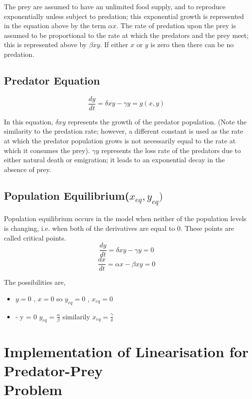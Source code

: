 \documentclass[12pt]{article}
\begin{document}
The prey are assumed to have an unlimited food supply, and to reproduce exponentially unless subject to predation;
this exponential growth is represented in the equation above by the term $ \alpha x . $ The rate of predation upon the prey is
assumed to be proportional to the rate at which the predators and the prey meet; this is represented above by $ \beta x y $. If
either $ x $ or $ y $ is zero then there can be no predation.

\subsection*{Predator Equation}
\begin{equation*}
    \frac { d y } { d t } = \delta x y - \gamma y = g(x,y)
\end{equation*}

In this equation, $ \delta x y $ represents the growth of the predator population. (Note the similarity to the predation rate;
however, a different constant is used as the rate at which the predator population grows is not necessarily equal to the
rate at which it consumes the prey). $ \gamma y $ represents the loss rate of the predators due to either natural death or
emigration; it leads to an exponential decay in the absence of prey.

\subsection*{Population Equilibrium($x_{eq},y_{eq})$}
Population equilibrium occurs in the model when neither of the population levels is changing, i.e. when both of the
derivatives are equal to $ 0 . $ These points are called critical points.
\begin{equation*}
    \frac { d y } { d t } = \delta x y - \gamma y = 0
\end{equation*}
\begin{equation*}
     \frac { d x } { d t } = \alpha x - \beta x y = 0
\end{equation*}

The possibilities are, 
\begin{itemize}
    \item $ y = 0 $ , $ x = 0 $ so $ y_{eq} = 0 $ , $ x_{eq} = 0 $
    \item \alpha - \beta y = 0 \Longrightarrow $y_{eq} = \frac{\alpha}{\beta}$ similarily $x_{eq} = \frac{\gamma}{\delta}$
\end{itemize}

\section*{Implementation of Linearisation for Predator-Prey \\ Problem \cite{noauthor_differential_nodate}} 
\end{document}
